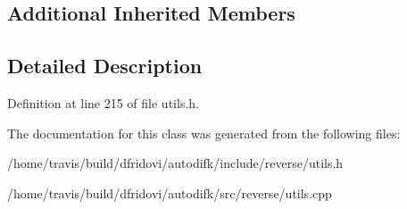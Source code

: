 \subsection*{Additional Inherited Members}


\subsection{Detailed Description}


Definition at line 215 of file utils.\-h.



The documentation for this class was generated from the following files\-:\begin{DoxyCompactItemize}
\item 
/home/travis/build/dfridovi/autodifk/include/reverse/utils.\-h\item 
/home/travis/build/dfridovi/autodifk/src/reverse/utils.\-cpp\end{DoxyCompactItemize}
